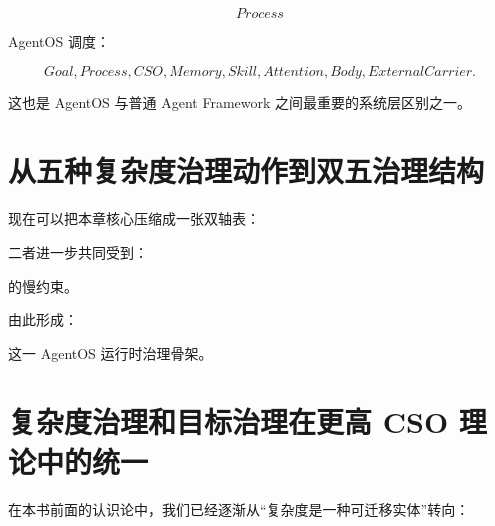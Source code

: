 \[
Process
\]

AgentOS 调度：

\[
Goal,
Process,
CSO,
Memory,
Skill,
Attention,
Body,
ExternalCarrier.
\]

这也是 AgentOS 与普通 Agent Framework 之间最重要的系统层区别之一。


\section{从五种复杂度治理动作到双五治理结构}

现在可以把本章核心压缩成一张双轴表：

\begin{statementbox}
\centering
{}
\end{statementbox}

二者进一步共同受到：

\begin{statementbox}
\centering
{}
\end{statementbox}

的慢约束。

由此形成：

\begin{statementbox}
\centering
{}
\end{statementbox}

这一 AgentOS 运行时治理骨架。


\section{复杂度治理和目标治理在更高 CSO 理论中的统一}

在本书前面的认识论中，我们已经逐渐从``复杂度是一种可迁移实体''转向：

\begin{statementbox}
\centering
{}
\end{statementbox}

